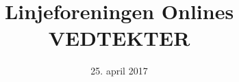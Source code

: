 \documentclass{vedtekter}
\title{\Large{}Linjeforeningen Onlines\\\Huge{VEDTEKTER}}
\date{
25. april 2017  %
\dobbelSignatur{Pia Lindkjølen}{Christoffer Lofsberg}  %
}
\begin{document}
\maketitle
\small{}
\tableofcontents
\newpage
\normalsize{}









\end{document}
